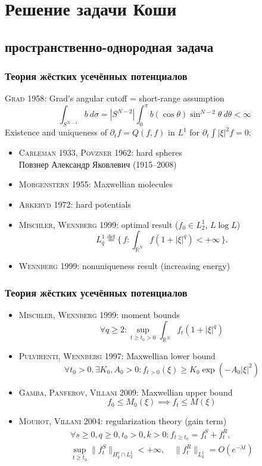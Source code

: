 \documentclass[mathserif]{beamer} %
\newcommand{\eqdef}{\overset{\mathrm{def}}{=}}
\newcommand{\dd}{\:d}%
\newcommand{\pder}[2][]{\partial_{#2}{#1}}
\newcommand{\OO}[1]{O(#1)}
\newcommand{\Set}[2]{\{\,{#1}:{#2}\,\}}
\newcommand{\Cite}[2][]{\alert{\textsc{#2 #1}}}
\begin{document}
\section{Решение задачи Коши}

\subsection{пространственно-однородная задача}

\begin{frame}
    \frametitle{Теория жёстких усечённых потенциалов}
    \Cite[1958]{Grad}: Grad's angular cutoff = short-range assumption
    \[ \int_{S^{N-1}} b\dd\sigma = |S^{N-2}|\int_0^\pi b(\cos\theta) \sin^{N-2}\theta\dd\theta < \infty \]
    Existence and uniqueness of \(\pder[f]{t} = Q(f,f)\) in \(L^1\) for \(\pder{t}\int|\xi|^2f=0\): \vspace{-20pt}
    \begin{itemize}
        \item \Cite[1933]{Carleman}, \Cite[1962]{Povzner}: hard spheres \\
        {\footnotesize Повзнер Александр Яковлевич (1915--2008)}
        \item \Cite[1955]{Morgenstern}: Maxwellian molecules
        \item \Cite[1972]{Arkeryd}: hard potentials
        \item \Cite[1999]{Mischler, Wennberg}: optimal result (\(f_0\in L^1_2\), \sout{\(L\log{L}\)})\!\!\!\!\!\!\!\!\!\!
        \[ L^1_q \eqdef \Set{f}{\int_{\mathbb{R}^N} f(1+|\xi|^q) < +\infty}. \]
        \item \Cite[1999]{Wennberg}: nonuniqueness result (increasing energy)
    \end{itemize}
\end{frame}

\begin{frame}
    \frametitle{Теория жёстких усечённых потенциалов}
    \begin{itemize}
        \item \Cite[1999]{Mischler, Wennberg}: moment bounds
        \[ \forall q\geq2: \sup_{t\geq t_0>0} \int_{\mathbb{R}^N} f_t (1+|\xi|^q) \]
        \item \Cite[1997]{Pulvirenti, Wennberg}: Maxwellian lower bound
        \[ \forall t_0>0, \exists K_0,A_0>0: f_{t>0}(\xi) \geq K_0\exp\left( -A_0 |\xi|^2\right) \]
        \item \Cite[2009]{Gamba, Panferov, Villani}: Maxwellian upper bound \!\!\!\!\!
        \[ f_0 \leq M_0(\xi) \implies f_t \leq M(\xi)\]
        \item \Cite[2004]{Mouhot, Villani}: regularization theory (gain term)
        \begin{gather*}
            \forall s\geq0,q\geq0,t_0>0,k>0 : f_{t\geq t_0} = f^S_t + f^R_t, \\
            \sup_{t\geq t_0} \|f^S_t\|_{H^s_q\cap L_2^1} < +\infty,
            \quad \|f^R_t\|_{L_k^1} = \OO{e^{-\lambda t}}
        \end{gather*}
    \end{itemize}
\end{frame}
\end{document}
